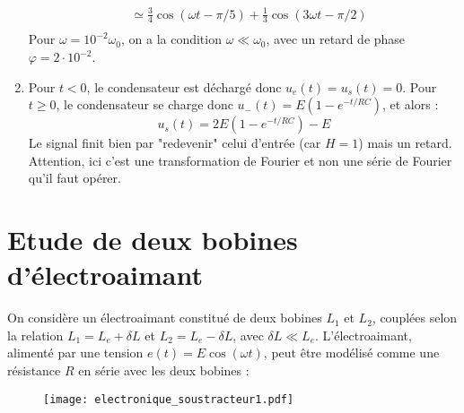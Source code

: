 \begin{correction}
\begin{enumerate}
\begin{equation}
\begin{array}{lll}
		 & \simeq \frac{3}{4}\cos(\omega t - \pi/5) + \frac{1}{3}\cos(3\omega t - \pi/2)\\
	\end{array}
\end{equation}		
	Pour $\omega = 10^{-2}\omega_0$, on a la condition $\omega\ll\omega_0$, avec un retard de phase $\varphi = 2\cdot10^{-2}$.
	
	\item Pour $t<0$, le condensateur est déchargé donc $u_e(t)=u_s(t)=0$. Pour $t\geq0$, le condensateur se charge donc $u_-(t) = E(1-e^{-t/RC})$, et alors :
	\begin{equation}
		u_s(t)=2E(1-e^{-t/RC}) - E
	\end{equation}
	Le signal finit bien par "redevenir" celui d'entrée (car $H=1$) mais un retard. Attention, ici c'est une transformation de Fourier et non une série de Fourier qu'il faut opérer. 
	
\end{enumerate}

\end{correction}

\newpage

\section{Etude de deux bobines d'électroaimant}

On considère un électroaimant constitué de deux bobines $L_1$ et $L_2$, couplées selon la relation $L_1=L_e+\delta L$ et $L_2=L_e-\delta L$, avec $\delta L\ll L_e$. L'électroaimant, alimenté par une tension $e(t)=E\cos(\omega t)$, peut être modélisé comme une résistance $R$ en série avec les deux bobines : 

\begin{figure}[!h]
\centering
\texttt{[image: electronique\_soustracteur1.pdf]}
\end{figure}

